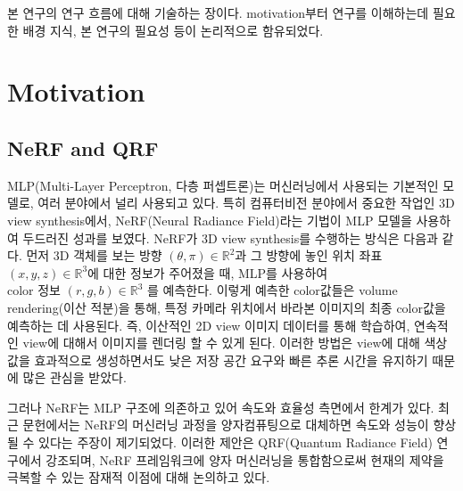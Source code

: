 

본 연구의 연구 흐름에 대해 기술하는 장이다. motivation부터 연구를 이해하는데 필요한 배경 지식, 본 연구의 필요성 등이 논리적으로 함유되었다.

\section{Motivation}
\subsection{NeRF and QRF}


MLP(Multi-Layer Perceptron, 다층 퍼셉트론)는 머신러닝에서 사용되는 기본적인 모델로, 여러 분야에서 널리 사용되고 있다. 특히 컴퓨터비전 분야에서 중요한 작업인 3D view synthesis에서, NeRF(Neural Radiance Field)라는 기법이 MLP 모델을 사용하여 두드러진 성과를 보였다. NeRF가 3D view synthesis를 수행하는 방식은 다음과 같다. 먼저 3D 객체를 보는 방향 \( (\theta, \pi)  \in \mathbb{R}^2\)과 그 방향에 놓인 위치 좌표 $(x,y,z) \in \mathbb{R}^3$에 대한 정보가 주어졌을 때, MLP를 사용하여 $\text{color 정보 }(r,g,b) \in \mathbb{R}^3$ 를 예측한다. 이렇게 예측한 color값들은 volume rendering(이산 적분)을 통해, 특정 카메라 위치에서 바라본 이미지의 최종 color값을 예측하는 데 사용된다. 즉, 이산적인 2D view 이미지 데이터를 통해 학습하여, 연속적인 view에 대해서 이미지를 렌더링 할 수 있게 된다. 이러한 방법은 view에 대해 색상 값을 효과적으로 생성하면서도 낮은 저장 공간 요구와 빠른 추론 시간을 유지하기 때문에 많은 관심을 받았다.

 그러나 NeRF는 MLP 구조에 의존하고 있어 속도와 효율성 측면에서 한계가 있다. 최근 문헌에서는 NeRF의 머신러닝 과정을 양자컴퓨팅으로 대체하면 속도와 성능이 향상될 수 있다는 주장이 제기되었다. 이러한 제안은 QRF(Quantum Radiance Field) 연구에서 강조되며, NeRF 프레임워크에 양자 머신러닝을 통합함으로써 현재의 제약을 극복할 수 있는 잠재적 이점에 대해 논의하고 있다.

